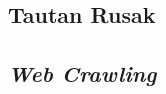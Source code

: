 \subsection{Tautan Rusak}
\label{subsec:0301-tautan-rusak}


\subsection{\textit{Web Crawling}}
\label{subsec:0301-web-crawlin}
